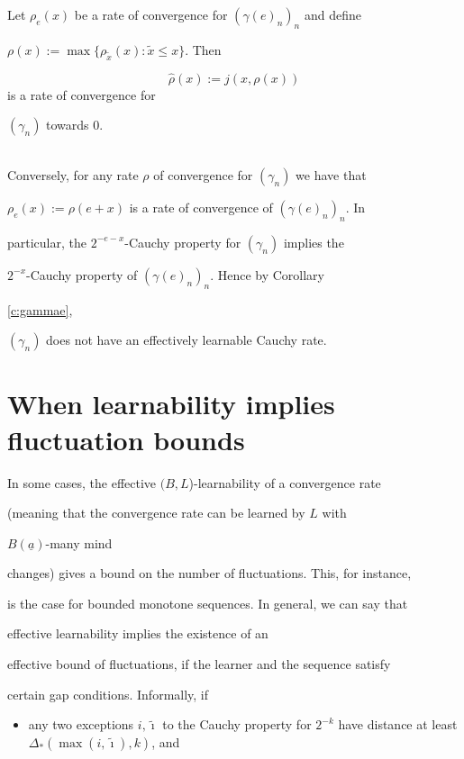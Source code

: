 \documentclass[1p]{elsarticle}
\theoremstyle{plain}
\theoremstyle{definition}
\theoremstyle{remark}
\renewenvironment{proof}[1][]{\noindent{\bf Proof{#1}. }}{\nopagebreak[4]{\hspace*{\fill}


  $\Box$              %

 }{\vspace{2ex}}}
\theoremstyle{definition}
\begin{document}
{\begin{proof}
Let $\rho_e(x)$ be a rate of convergence for $(\gamma(e)_n)_n$ and define 

$\rho(x):=\max\{ \rho_{\tilde{x}}(x):\tilde{x}\le x\}.$ Then 

\[ \widehat{\rho}(x):=j(x,\rho(x)) \] is a rate of convergence for 

$(\gamma_n)$ towards $0.$

\\

Conversely, for any rate $\rho$ of convergence for $(\gamma_n)$ we have that 

$\rho_e(x):=\rho(e+x)$ is a rate of convergence of $(\gamma(e)_n)_n$. In 

particular, the $2^{-e-x}$-Cauchy property for $(\gamma_n)$ implies the 

$2^{-x}$-Cauchy property of $(\gamma(e)_n)_n.$ Hence by Corollary 

\ref{c:gammae}, 

$(\gamma_n)$ does not have an effectively learnable Cauchy rate.

\end{proof}





\section{When learnability implies fluctuation bounds}





In some cases, the effective $(B,L$)-learnability of a convergence rate 

(meaning that the convergence rate can be learned by $L$ with 

$B(\underline{a})$-many mind 

changes) gives a bound on the number of fluctuations. This, for instance, 

is the case for bounded monotone sequences. In general, we can say that

effective learnability implies the existence of an

effective bound of fluctuations, if the learner and the sequence satisfy

certain gap conditions. Informally, if

\begin{itemize}

\item any two exceptions $i,\tilde{\imath}$ to the Cauchy property for $2^{-k}$ have distance at least $\Delta_*(\max(i,\tilde{\imath}),k)$, and


\end{itemize}}
\end{document}
